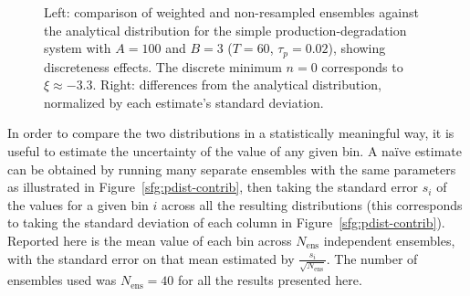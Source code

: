 \documentclass[english,letterpaper,12pt]{report}
\begin{document}
\begin{doublespacing}
\begin{figure}[t]
    \makebox[\linewidth][c]{
        \begin{subfigure}{3in}
            \begin{center}
                
            \end{center}
            \label{sfg:pdwe1-comp}
        \end{subfigure}
        \begin{subfigure}{3in}
            \begin{center}
                
            \end{center}
            \label{sfg:pdwe1-chi}
        \end{subfigure}
    }
    \caption{Left: comparison of weighted and non-resampled ensembles against the analytical distribution for the simple production-degradation system with $A=100$ and $B=3$ ($T=60$, $\tau_p = 0.02$), showing discreteness effects. The discrete minimum $n=0$ corresponds to $\xi \approx -3.3$. Right: differences from the analytical distribution, normalized by each estimate's standard deviation.}
    \label{fig:pdwe1}
\end{figure}

In order to compare the two distributions in a statistically meaningful way, it is useful to estimate the uncertainty of the value of any given bin. A na\"{i}ve estimate can be obtained by running many separate ensembles with the same parameters as illustrated in Figure~\ref{sfg:pdist-contrib}, then taking the standard error $s_i$ of the values for a given bin $i$ across all the resulting distributions (this corresponds to taking the standard deviation of each column in Figure~\ref{sfg:pdist-contrib}). Reported here is the mean value of each bin across $N_\text{ens}$ independent ensembles, with the standard error on that mean estimated by $\frac{s_i}{\sqrt{N_\text{ens}}}$. The number of ensembles used was $N_\text{ens} = 40$ for all the results presented here.


\end{doublespacing}
\end{document}
